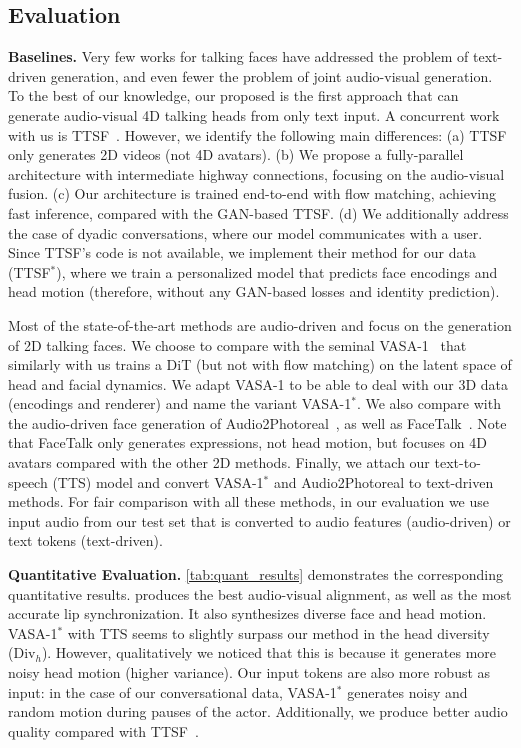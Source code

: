 \subsection{Evaluation}

\textbf{Baselines.} Very few works for talking faces have addressed the problem of text-driven generation, and even fewer the problem of joint audio-visual generation. To the best of our knowledge, our proposed \MethodName is the first approach that can generate audio-visual 4D talking heads from only text input. A concurrent work with us is TTSF~\cite{Jang_2024_CVPR}. However, we identify the following  main differences: (a) TTSF only generates 2D videos (not 4D avatars). (b) We propose a fully-parallel architecture with intermediate highway connections, focusing on the audio-visual fusion. (c) Our architecture is trained end-to-end with flow matching, achieving fast inference, compared with the GAN-based TTSF. (d) We additionally address the case of dyadic conversations, where our model communicates with a user.  Since TTSF's code is not available, we implement their method for our data (TTSF$^{*}$), where we train a personalized model that predicts face encodings and head motion (therefore, without any GAN-based losses and identity prediction). 

Most of the state-of-the-art methods are audio-driven and focus on the generation of 2D talking faces. We choose to compare with the seminal VASA-1~\cite{xu2024vasa} that similarly with us trains a DiT (but not with flow matching) on the latent space of head and facial dynamics. We adapt VASA-1 to be able to deal with our 3D data (encodings and renderer) and name the variant VASA-1$^{*}$. We also compare with the audio-driven face generation of Audio2Photoreal~\cite{wan2013photo}, as well as FaceTalk~\cite{aneja2023facetalk}. Note that FaceTalk only generates expressions, not head motion, but focuses on 4D avatars compared with the other 2D methods. Finally, we attach our text-to-speech (TTS) model and convert VASA-1$^{*}$ and Audio2Photoreal to text-driven methods. For fair comparison with all these methods, in our evaluation we use input audio from our test set that is converted to audio features (audio-driven) or text tokens (text-driven). 

\noindent
\textbf{Quantitative Evaluation.} \cref{tab:quant_results} demonstrates the corresponding quantitative results. \MethodName produces the best audio-visual alignment, as well as the most accurate lip synchronization. It also synthesizes diverse face and head motion. VASA-1$^{*}$ with TTS seems to slightly surpass our method in the head diversity (Div$_{h}$). However, qualitatively we noticed that this is because it generates more noisy head motion (higher variance). Our input tokens are also more robust as input: in the case of our conversational data, VASA-1$^{*}$ generates noisy and random motion during pauses of the actor. Additionally, we produce better audio quality compared with TTSF~\cite{Jang_2024_CVPR}. 

